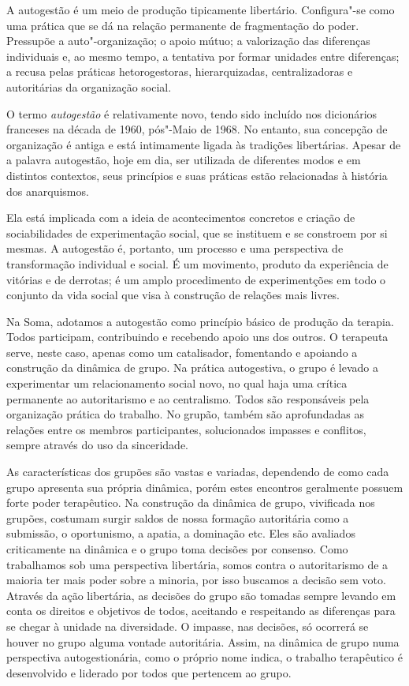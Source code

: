 A autogestão é um meio de produção tipicamente libertário. Configura"-se
como uma prática que se dá na relação permanente de fragmentação do
poder. Pressupõe a auto"-organização; o apoio mútuo; a valorização das
diferenças individuais e, ao mesmo tempo, a tentativa por formar
unidades entre diferenças; a recusa pelas práticas hetorogestoras,
hierarquizadas, centralizadoras e autoritárias da organização social.

O termo \emph{autogestão} é relativamente novo, tendo sido incluído nos
dicionários franceses na década de 1960, pós"-Maio de 1968. No entanto,
sua concepção de organização é antiga e está intimamente ligada às
tradições libertárias. Apesar de a palavra autogestão, hoje em dia, ser
utilizada de diferentes modos e em distintos contextos, seus princípios
e suas práticas estão relacionadas à história dos anarquismos.

Ela está implicada com a ideia de acontecimentos concretos e criação de
sociabilidades de experimentação social, que se instituem e se constroem
por si mesmas. A autogestão é, portanto, um processo e uma perspectiva
de transformação individual e social. É um movimento, produto da
experiência de vitórias e de derrotas; é um amplo procedimento de
experimentções em todo o conjunto da vida social que visa à construção
de relações mais livres.

Na Soma, adotamos a autogestão como princípio básico de produção da
terapia. Todos participam, contribuindo e recebendo apoio uns dos
outros. O terapeuta serve, neste caso, apenas como um catalisador,
fomentando e apoiando a construção da dinâmica de grupo. Na prática
autogestiva, o grupo é levado a experimentar um relacionamento social
novo, no qual haja uma crítica permanente ao autoritarismo e ao
centralismo. Todos são responsáveis pela organização prática do
trabalho. No grupão, também são aprofundadas as relações entre os
membros participantes, solucionados impasses e conflitos, sempre através
do uso da sinceridade.

As características dos grupões são vastas e variadas, dependendo de como
cada grupo apresenta sua própria dinâmica, porém estes encontros
geralmente possuem forte poder terapêutico. Na construção da dinâmica de
grupo, vivificada nos grupões, costumam surgir saldos de nossa formação
autoritária como a submissão, o oportunismo, a apatia, a dominação etc.
Eles são avaliados criticamente na dinâmica e o grupo toma decisões por
consenso. Como trabalhamos sob uma perspectiva libertária, somos contra
o autoritarismo de a maioria ter mais poder sobre a minoria, por isso
buscamos a decisão sem voto. Através da ação libertária, as decisões do
grupo são tomadas sempre levando em conta os direitos e objetivos de
todos, aceitando e respeitando as diferenças para se chegar à unidade na
diversidade. O impasse, nas decisões, só ocorrerá se houver no grupo
alguma vontade autoritária. Assim, na dinâmica de grupo numa perspectiva
autogestionária, como o próprio nome indica, o trabalho terapêutico é
desenvolvido e liderado por todos que pertencem ao grupo.


